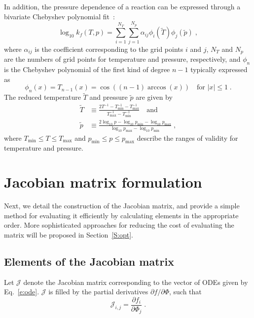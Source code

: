\documentclass[preprint,12pt]{elsarticle}
\newcommand{ \dydx } [2] { \frac{ \partial #1 }{ \partial #2 } }
\begin{document}
In addition, the pressure dependence of a reaction can be expressed through a bivariate Chebyshev polynomial fit~\cite{Venkatesh:1997hv,Venkatesh:1997ik,Venkatesh:2000gj,chemkin:2012,Goodwin:2015aa}:
\begin{equation}
\log_{10} k_{f}(T, p) = \sum_{i = 1}^{N_T} \sum_{j = 1}^{N_p} \alpha_{ij} \phi_i (\tilde{T}) \phi_j \left(\tilde{p}\right) \label{e:cheb} \;,
\end{equation}
where $\alpha_{ij}$ is the coefficient corresponding to the grid points $i$ and $j$, $N_T$ and $N_p$ are the numbers of grid points for temperature and pressure, respectively, and $\phi_n$ is the Chebyshev polynomial of the first kind of degree $n - 1$ typically expressed as
\begin{equation}
\phi_n (x) = T_{n-1} (x) = \cos \left( (n - 1) \arccos (x) \right) \quad \text{for } |x| \leq 1 \;.
\end{equation}
The reduced temperature $\tilde{T}$ and pressure $\tilde{p}$ are given by
\begin{align}
\tilde{T} &\equiv \frac{2 T^{-1} - T^{-1}_{\min} - T^{-1}_{\max}}{T^{-1}_{\max} - T^{-1}_{\min}} \quad\text{and} \\
\tilde{p} &\equiv \frac{2\log_{10} p - \log_{10} p_{\min} - \log_{10} p_{\max}}{\log_{10} p_{\max} - \log_{10} p_{\min}} \;,
\end{align}
where $T_{\min} \leq T \leq T_{\max}$ and $p_{\min} \leq p \leq p_{\max}$ describe the ranges of validity for temperature and pressure.


\section{Jacobian matrix formulation}

Next, we detail the construction of the Jacobian matrix, and provide a simple method for evaluating it efficiently by calculating elements in the appropriate order.
More sophisticated approaches for reducing the cost of evaluating the matrix will be proposed in Section~\ref{S:opt}.

\subsection{Elements of the Jacobian matrix}

Let $\mathcal{J}$ denote the Jacobian matrix corresponding to the vector of ODEs given by Eq.~\eqref{e:ode}.
$\mathcal{J}$ is filled by the partial derivatives $\partial f / \partial \Phi$, such that
\begin{equation}
\mathcal{J}_{i,j} = \dydx{f_i}{\Phi_j} \;.
\end{equation}
\end{document}
